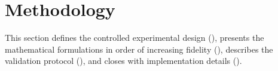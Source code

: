 \documentclass[a4paper,fleqn]{cas-dc}
\begin{document}
\section{Methodology}
\label{sec:methodology}

This section defines the controlled experimental design
(), presents the mathematical formulations in
order of increasing fidelity (),
describes the validation protocol (), and
closes with implementation details ().
\end{document}
